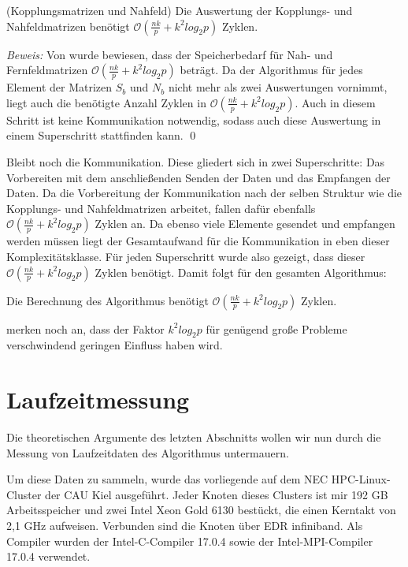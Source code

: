   \begin{lem}
  \label{lem:koppl}
    (Kopplungsmatrizen und Nahfeld)
    Die Auswertung der Kopplungs- und Nahfeldmatrizen benötigt $\mathcal{O}(\frac{nk}{p} + k^2 log_2p)$ Zyklen.
  \end{lem}

  \textit{Beweis:}
  Von \citet{distrh2} wurde bewiesen, dass der Speicherbedarf für Nah- und Fernfeldmatrizen $\mathcal{O}(\frac{nk}{p} + k^2 log_2p)$ beträgt. Da der Algorithmus für jedes Element der Matrizen $S_b$ und
  $N_b$ nicht mehr als zwei Auswertungen vornimmt, liegt auch die benötigte Anzahl Zyklen in $\mathcal{O}(\frac{nk}{p} + k^2 log_2p)$. Auch in diesem Schritt ist keine Kommunikation notwendig, sodass 
  auch diese Auswertung in einem Superschritt stattfinden kann. \qed
  
  Bleibt noch die Kommunikation. Diese gliedert sich in zwei Superschritte: Das Vorbereiten mit dem anschließenden Senden der Daten und das Empfangen der Daten. Da die Vorbereitung der Kommunikation 
  nach der selben Struktur wie die Kopplungs- und Nahfeldmatrizen arbeitet, fallen dafür ebenfalls $\mathcal{O}(\frac{nk}{p} + k^2 log_2p)$ Zyklen an.
  Da ebenso viele Elemente gesendet und empfangen werden müssen liegt der Gesamtaufwand für die Kommunikation in eben dieser Komplexitätsklasse. Für jeden Superschritt wurde also gezeigt, dass dieser
  $\mathcal{O}(\frac{nk}{p} + k^2 log_2p)$ Zyklen benötigt. Damit folgt für den gesamten Algorithmus:
  
  \begin{thm}
    Die Berechnung des Algorithmus benötigt $\mathcal{O}(\frac{nk}{p} + k^2 log_2p)$ Zyklen.
  \end{thm}
  
  \citet{distrh2} merken noch an, dass der Faktor $k^2 log_2p$ für genügend große Probleme verschwindend geringen Einfluss haben wird.
  
  \section{Laufzeitmessung}
  Die theoretischen Argumente des letzten Abschnitts wollen wir nun durch die Messung von Laufzeitdaten des Algorithmus untermauern.
  
  Um diese Daten zu sammeln, wurde das vorliegende auf dem NEC HPC-Linux-Cluster der CAU Kiel ausgeführt. Jeder Knoten dieses Clusters ist mir 192 GB Arbeitsspeicher und zwei Intel Xeon Gold 
  6130 bestückt, die einen Kerntakt von 2,1 GHz aufweisen. Verbunden sind die Knoten über EDR infiniband. Als Compiler wurden der Intel-C-Compiler 17.0.4 sowie der Intel-MPI-Compiler 17.0.4 verwendet.
  
